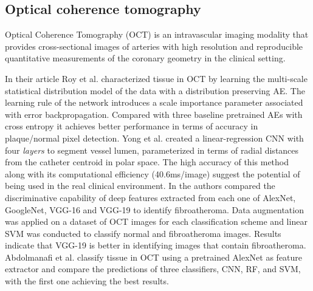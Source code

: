 \documentclass[journal]{IEEEtran}
\begin{document}
\subsection{Optical coherence tomography}
Optical Coherence Tomography (OCT) is an intravascular imaging modality that provides cross-sectional images of arteries with high resolution and reproducible quantitative measurements of the coronary geometry in the clinical setting\cite{kubo2013oct}.

In their article Roy et al.\cite{roy2016multiscale} characterized tissue in OCT by learning the multi-scale statistical distribution model of the data with a distribution preserving AE\@.
The learning rule of the network introduces a scale importance parameter associated with error backpropagation.
Compared with three baseline pretrained AEs with cross entropy it achieves better performance in terms of accuracy in plaque/normal pixel detection.
Yong et al.\cite{yong2017linear} created a linear-regression CNN with four \textit{layers} to segment vessel lumen, parameterized in terms of radial distances from the catheter centroid in polar space.
The high accuracy of this method along with its computational efficiency (40.6ms/image) suggest the potential of being used in the real clinical environment.
In\cite{xu2017fibroatheroma} the authors compared the discriminative capability of deep features extracted from each one of AlexNet, GoogleNet, VGG-16 and VGG-19 to identify fibroatheroma.
Data augmentation was applied on a dataset of OCT images for each classification scheme and linear SVM was conducted to classify normal and fibroatheroma images.
Results indicate that VGG-19 is better in identifying images that contain fibroatheroma.
Abdolmanafi et al.\cite{abdolmanafi2017deep} classify tissue in OCT using a pretrained AlexNet as feature extractor and compare the predictions of three classifiers, CNN, RF, and SVM, with the first one achieving the best results.
\end{document}
